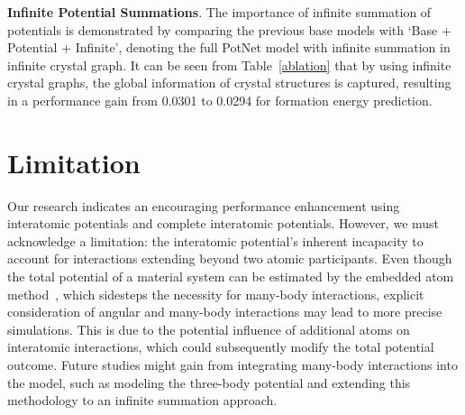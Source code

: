 \documentclass[nohyperref]{article}
\theoremstyle{plain}
\theoremstyle{definition}
\theoremstyle{remark}
\begin{document}
\textbf{Infinite Potential Summations}. The importance of infinite summation of potentials is demonstrated by comparing the previous base models with `Base + Potential + Infinite', denoting the full PotNet model with infinite summation in infinite crystal graph. It can be seen from Table~\ref{ablation} that by using infinite crystal graphs, the global information of crystal structures is captured, resulting in a performance gain from 0.0301 to 0.0294 for formation energy prediction.

\section{Limitation}

Our research indicates an encouraging performance enhancement using interatomic potentials and complete interatomic potentials. However, we must acknowledge a limitation: the interatomic potential's inherent incapacity to account for interactions extending beyond two atomic participants. Even though the total potential of a material system can be estimated by the embedded atom method~\citep{eam}, which sidesteps the necessity for many-body interactions, explicit consideration of angular and many-body interactions may lead to more precise simulations. This is due to the potential influence of additional atoms on interatomic interactions, which could subsequently modify the total potential outcome. Future studies might gain from integrating many-body interactions into the model, such as modeling the three-body potential and extending this methodology to an infinite summation approach.

\begin{table}[t]
\caption{Ablation studies for the effects of adding Coulomb potentials and infinite summation.}
\begin{center}
\vspace{-0.3cm}
\label{ablation}
\end{center}
\vspace{-0.9cm}
\end{table}
\end{document}
